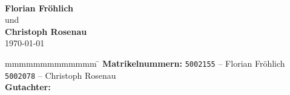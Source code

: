 \begin{titlepage}
\begin{center}
		\vspace*{12mm}	\langvon\\
		\vspace*{3mm}		{\large\textbf{Florian Fröhlich}}\\
		\vspace*{3mm}		{und}\\
		\vspace*{3mm}		{\large\textbf{Christoph Rosenau}}\\
		\vspace*{12mm}	\today\\
	\end{center}
	\vfill
	\begin{spacing}{1.2}
	\begin{tabbing}
		mmmmmmmmmmmmm             \= \kill
		\textbf{Matrikelnummern:}  \>  \texttt{5002155} -- Florian Fröhlich\\
								\>  \texttt{5002078} -- Christoph Rosenau\\
		\textbf{Gutachter:}              \>  \gutachter
	\end{tabbing}
	\end{spacing}
\end{titlepage}
